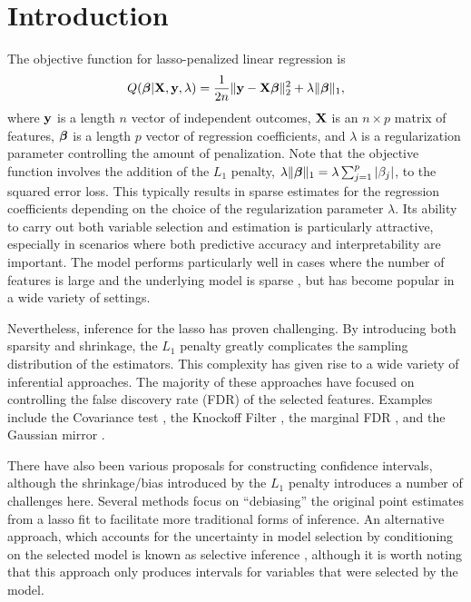 \section{Introduction}

The objective function for lasso-penalized linear regression \citep{Tibshirani1996} is 
$$Q(\boldsymbol{\beta}|\mathbf{X},\mathbf{y},\lambda) = \frac{1}{2n}\lVert\mathbf{y} - \mathbf{X}\boldsymbol{\beta}\rVert_2^2 + \lambda\lVert\boldsymbol{\beta}\rVert_1,$$
where $\mathbf{y}$ is a length $n$ vector of independent outcomes, $\mathbf{X}$ is an $n \times p$ matrix of features, $\boldsymbol{\beta}$ is a length $p$ vector of regression coefficients, and $\lambda$ is a regularization parameter controlling the amount of penalization. Note that the objective function involves the addition of the $L_1$ penalty, $\lambda\lVert\boldsymbol{\beta}\rVert_1 = \lambda \sum_{j = 1}^p |\beta_j|$, to the squared error loss. This typically results in sparse estimates for the regression coefficients depending on the choice of the regularization parameter $\lambda$. Its ability to carry out both variable selection and estimation is particularly attractive, especially in scenarios where both predictive accuracy and interpretability are important. The model performs particularly well in cases where the number of features is large and the underlying model is sparse \citep{HTF2009}, but has become popular in a wide variety of settings.

Nevertheless, inference for the lasso has proven challenging. By introducing both sparsity and shrinkage, the $L_1$ penalty greatly complicates the sampling distribution of the estimators. This complexity has given rise to a wide variety of inferential approaches. The majority of these approaches have focused on controlling the false discovery rate (FDR) of the selected features. Examples include the Covariance test \citep{Lockhart2014}, the Knockoff Filter \citep{Candes2015,Candes2018}, the marginal FDR \citep{Breheny2019}, and the Gaussian mirror \citep{Xing2023}.

There have also been various proposals for constructing confidence intervals, although the shrinkage/bias introduced by the $L_1$ penalty introduces a number of challenges here. Several methods \citep{ZhangZhang2014,Javanmard2014} focus on ``debiasing'' the original point estimates from a lasso fit to facilitate more traditional forms of inference. An alternative approach, which accounts for the uncertainty in model selection by conditioning on the selected model is known as selective inference \citep{LeeEtAl2016}, although it is worth noting that this approach only produces intervals for variables that were selected by the model.

